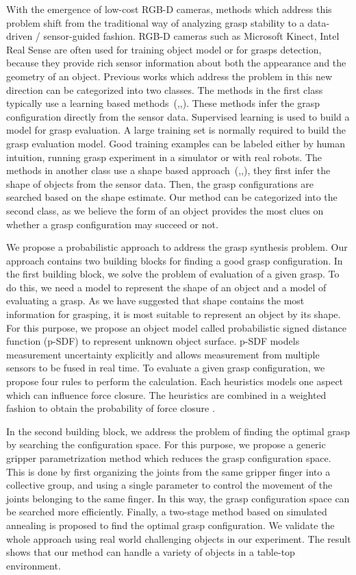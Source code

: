 With the emergence of low-cost RGB-D cameras, methods which address this problem shift from the traditional way of analyzing grasp stability to a data-driven / sensor-guided fashion. RGB-D cameras such as Microsoft Kinect, Intel Real Sense are often used for training object model or for grasps detection, because they provide rich sensor information about both the appearance and the geometry of an object. Previous works which address the problem in this new direction can be categorized into two classes. The methods in the first class typically use a learning based methods~(\cite{Kroemer2010},\cite{Tegin2009},\cite{Stulp2011}). These methods infer the grasp configuration directly from the sensor data. Supervised learning is used to build a model for grasp evaluation.  A large training set is normally required to build the grasp evaluation model. Good training examples can be labeled either by human intuition, running grasp experiment in a simulator\cite{Miller2004} or with real robots\cite{Levine2016}. The methods in another class use a shape based approach~(\cite{Miller2003},\cite{Przybylski2011},\cite{Goldfeder2007}), they first infer the shape of objects from the sensor data. Then, the grasp configurations are searched based on the shape estimate. Our method can be categorized into the second class, as we believe the form of an object provides the most clues on whether a grasp configuration may succeed or not. 

We propose a probabilistic approach to address the grasp synthesis problem. Our approach contains two building blocks for finding a good grasp configuration. In the first building block, we solve the problem of evaluation of a given grasp. To do this, we need a model to represent the shape of an object and a model of evaluating a grasp. As we have suggested that shape contains the most information for grasping, it is most suitable to represent an object by its shape. For this purpose, we propose an object model called
 probabilistic signed distance function (p-SDF) to represent unknown object surface. p-SDF models measurement uncertainty explicitly and allows measurement
 from multiple sensors to be fused in real time. To evaluate a given grasp configuration, we propose four rules to perform the calculation. Each heuristics models one aspect which can influence force closure. The heuristics are combined in a weighted fashion to obtain the probability of force closure . 

In the second building block, we address the problem of finding the optimal grasp by searching the configuration space. For this purpose, we propose a generic gripper parametrization method which reduces the grasp configuration space. This is done by first organizing the joints from the same gripper finger into a collective group, and using a single parameter to control the movement of the joints belonging to the same finger. In this way, the grasp configuration space can be searched more efficiently. Finally, a  two-stage method based on simulated annealing is proposed to find the optimal grasp configuration. We validate the whole approach using real world challenging objects in our experiment. The result shows that our method can handle a variety of objects in a table-top environment. 
